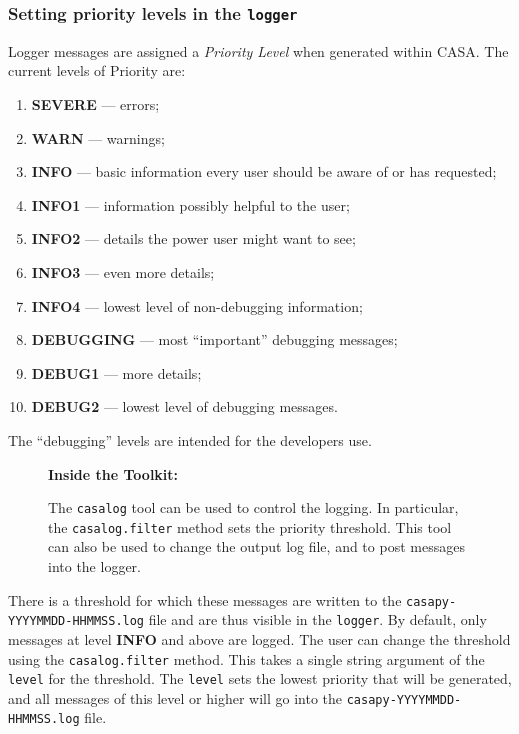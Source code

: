 \subsubsection{Setting priority levels in the {\tt logger}}
\label{section:intro.common.logger.levels}

Logger messages are assigned a {\it Priority Level} when generated
within CASA.  The current levels of Priority are:
\begin{enumerate}
\item {\bf SEVERE} --- errors;
\item {\bf WARN} --- warnings;
\item {\bf INFO} --- basic information every user should be aware of or
  has requested;
\item {\bf INFO1} --- information possibly helpful to the user;
\item {\bf INFO2} --- details the power user might want to see;
\item {\bf INFO3} --- even more details;
\item {\bf INFO4} --- lowest level of non-debugging information;
\item {\bf DEBUGGING} --- most ``important'' debugging messages;
\item {\bf DEBUG1} --- more details;
\item {\bf DEBUG2} --- lowest level of debugging messages.
\end{enumerate}
The ``debugging'' levels are intended for the developers use.

\begin{wrapfigure}{r}{2.5in}
  \begin{boxedminipage}{2.5in}
     \centerline{\bf Inside the Toolkit:}
     The {\tt casalog} tool can be used to control the logging.
     In particular, the {\tt casalog.filter} method sets the
     priority threshold.  This tool can also be used to change
     the output log file, and to post messages into the logger.
  \end{boxedminipage}
\end{wrapfigure}

There is a threshold for which these messages are
written to the {\tt casapy-YYYYMMDD-HHMMSS.log} file and are thus visible in the
{\tt logger}.  By default, only messages at level {\bf INFO} and
above are logged.  The user can change the threshold using the
{\tt casalog.filter} method.  This takes a single string argument of
the {\tt level} for the threshold.  The {\tt level} sets the lowest
priority that will be generated, and all messages of this level or
higher will go into the {\tt casapy-YYYYMMDD-HHMMSS.log} file.

